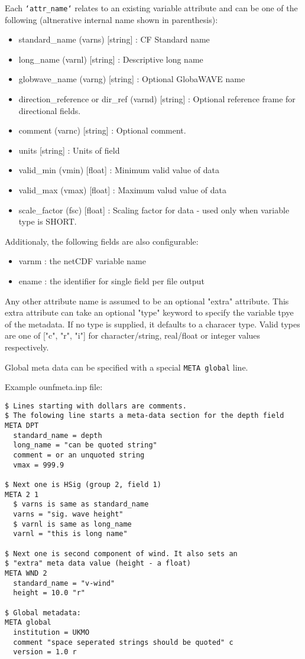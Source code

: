 \noindent
Each \texttt{`attr\_name`} relates to an existing variable attribute and
can be one of the following (altnerative internal name shown in parenthesis):
\begin{itemize}
 \item  standard\_name (varns) [string] : CF Standard name
 \item  long\_name (varnl) [string] : Descriptive long name
 \item  globwave\_name (varng) [string] : Optional GlobaWAVE name
 \item  direction\_reference or dir\_ref (varnd) [string] : Optional reference
 frame for directional fields.
 \item  comment (varnc) [string] : Optional comment.
 \item  units [string] : Units of field
 \item  valid\_min (vmin) [float] : Minimum valid value of data
 \item  valid\_max (vmax) [float] : Maximum valud value of data
 \item  scale\_factor (fsc) [float] : Scaling factor for data - used only when
 variable type is SHORT.
\end{itemize}

\noindent
Additionaly, the following fields are also configurable:
\begin{itemize}
 \item  varnm : the netCDF variable name
 \item  ename : the identifier for single field per file output
\end{itemize}

\noindent
Any other attribute name is assumed to be an optional "extra" 
attribute. This extra attribute can take an optional "type"
keyword to specify the variable tpye of the metadata. If 
no type is supplied, it defaults to a characer type. Valid
types are one of ["c", "r", "i"] for character/string, 
real/float or integer values respectively.

\noindent
Global meta data can be specified with a special \texttt{META global} line.

\noindent
Example ounfmeta.inp file:

\begin{verbatim}
$ Lines starting with dollars are comments.
$ The folowing line starts a meta-data section for the depth field
META DPT
  standard_name = depth
  long_name = "can be quoted string"
  comment = or an unquoted string
  vmax = 999.9

$ Next one is HSig (group 2, field 1)
META 2 1
  $ varns is same as standard_name
  varns = "sig. wave height"
  $ varnl is same as long_name
  varnl = "this is long name"

$ Next one is second component of wind. It also sets an
$ "extra" meta data value (height - a float)
META WND 2
  standard_name = "v-wind"
  height = 10.0 "r"

$ Global metadata:
META global
  institution = UKMO
  comment "space seperated strings should be quoted" c
  version = 1.0 r

\end{verbatim}

\pb
